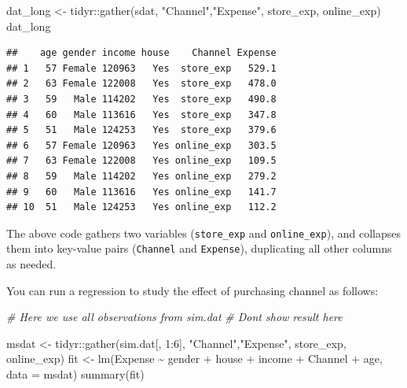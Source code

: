 \documentclass[
  12pt,
]{krantz}
\makeatletter
\newenvironment{Shaded}{\begin{snugshade}}{\end{snugshade}}
\newcommand{\AttributeTok}[1]{\textcolor[rgb]{0.61,0.61,0.61}{#1}}
\newcommand{\CommentTok}[1]{\textcolor[rgb]{0.37,0.37,0.37}{\textit{#1}}}
\newcommand{\DecValTok}[1]{\textcolor[rgb]{0.06,0.06,0.06}{#1}}
\newcommand{\FunctionTok}[1]{\textcolor[rgb]{0,0,0}{#1}}
\newcommand{\NormalTok}[1]{#1}
\newcommand{\OtherTok}[1]{\textcolor[rgb]{0.37,0.37,0.37}{#1}}
\newcommand{\SpecialCharTok}[1]{\textcolor[rgb]{0,0,0}{#1}}
\newcommand{\StringTok}[1]{\textcolor[rgb]{0.5,0.5,0.5}{#1}}
\newenvironment{kframe}{%
\medskip{}
\setlength{\fboxsep}{.8em}
 \def\at@end@of@kframe{}%
 \ifinner\ifhmode%
  \def\at@end@of@kframe{\end{minipage}}%
  \begin{minipage}{\columnwidth}%
 \fi\fi%
 \def\FrameCommand##1{\hskip\@totalleftmargin \hskip-\fboxsep
 \colorbox{shadecolor}{##1}\hskip-\fboxsep
     \hskip-\linewidth \hskip-\@totalleftmargin \hskip\columnwidth}%
 \MakeFramed {\advance\hsize-\width
   \@totalleftmargin\z@ \linewidth\hsize
   \@setminipage}}%
 {\par\unskip\endMakeFramed%
 \at@end@of@kframe}
\renewenvironment{Shaded}{\begin{kframe}}{\end{kframe}}
\makeatother
\begin{document}
\begin{Shaded}
\begin{Highlighting}[]
\NormalTok{dat\_long }\OtherTok{\textless{}{-}}\NormalTok{ tidyr}\SpecialCharTok{::}\FunctionTok{gather}\NormalTok{(sdat, }\StringTok{"Channel"}\NormalTok{,}\StringTok{"Expense"}\NormalTok{, }
\NormalTok{                       store\_exp, online\_exp)}
\NormalTok{dat\_long}
\end{Highlighting}
\end{Shaded}

\begin{verbatim}
##    age gender income house    Channel Expense
## 1   57 Female 120963   Yes  store_exp   529.1
## 2   63 Female 122008   Yes  store_exp   478.0
## 3   59   Male 114202   Yes  store_exp   490.8
## 4   60   Male 113616   Yes  store_exp   347.8
## 5   51   Male 124253   Yes  store_exp   379.6
## 6   57 Female 120963   Yes online_exp   303.5
## 7   63 Female 122008   Yes online_exp   109.5
## 8   59   Male 114202   Yes online_exp   279.2
## 9   60   Male 113616   Yes online_exp   141.7
## 10  51   Male 124253   Yes online_exp   112.2
\end{verbatim}

The above code gathers two variables (\texttt{store\_exp} and \texttt{online\_exp}), and collapses them into key-value pairs (\texttt{Channel} and \texttt{Expense}), duplicating all other columns as needed.

You can run a regression to study the effect of purchasing channel as follows:

\begin{Shaded}
\begin{Highlighting}[]
\CommentTok{\# Here we use all observations from sim.dat}
\CommentTok{\# Don\textquotesingle{}t show result here}

\NormalTok{msdat }\OtherTok{\textless{}{-}}\NormalTok{ tidyr}\SpecialCharTok{::}\FunctionTok{gather}\NormalTok{(sim.dat[, }\DecValTok{1}\SpecialCharTok{:}\DecValTok{6}\NormalTok{], }\StringTok{"Channel"}\NormalTok{,}\StringTok{"Expense"}\NormalTok{, }
\NormalTok{                       store\_exp, online\_exp)}
\NormalTok{fit }\OtherTok{\textless{}{-}} \FunctionTok{lm}\NormalTok{(Expense }\SpecialCharTok{\textasciitilde{}}\NormalTok{ gender }\SpecialCharTok{+}\NormalTok{ house }\SpecialCharTok{+}\NormalTok{ income }\SpecialCharTok{+}\NormalTok{ Channel }\SpecialCharTok{+}\NormalTok{ age, }
          \AttributeTok{data =}\NormalTok{ msdat)}
\FunctionTok{summary}\NormalTok{(fit)}
\end{Highlighting}
\end{Shaded}
\end{document}
